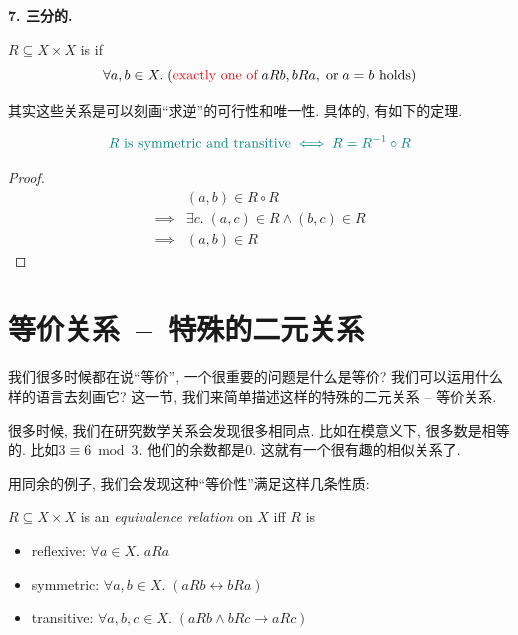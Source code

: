 \textbf{7. 三分的.}

\begin{definition}
  $R \subseteq X \times X$ is  if
  \[
    \forall a, b \in X.\;
      (\text{\textcolor{red}{exactly one of}}\; a R b, b R a, \;\text{or}\; a = b \text{ holds})
  \]
\end{definition}

其实这些关系是可以刻画``求逆''的可行性和唯一性. 具体的, 有如下的定理.

\begin{theorem}
  \[
    \textcolor{teal}{R \text{ is symmetric and transitive} \iff R = R^{-1} \circ R}
  \]
\end{theorem}

\begin{proof}
  \setcounter{equation}{0}
  \begin{align*}
    &(a, b) \in R \circ R \\[6pt]
    \implies& \exists c.\; (a, c) \in R \land (b, c) \in R \\
    \implies& (a, b) \in R
  \end{align*}
\end{proof}

\section{等价关系~--~特殊的二元关系}

我们很多时候都在说``等价'', 一个很重要的问题是什么是等价? 我们可以运用什么样的语言去刻画它? 这一节, 我们来简单描述这样的特殊的二元关系 -- 等价关系.

很多时候, 我们在研究数学关系会发现很多相同点. 比如在模意义下, 很多数是相等的. 比如$3 \equiv 6 \bmod 3$. 他们的余数都是$0$. 这就有一个很有趣的相似关系了. 

用同余的例子, 我们会发现这种``等价性''满足这样几条性质: 

\begin{definition}
  $R \subseteq X \times X$ is an {\it equivalence relation} on $X$ iff $R$ is
  \begin{itemize}
    \item reflexive: $\forall a \in X.\; a R a$
    \item symmetric: $\forall a, b \in X.\; (a R b \leftrightarrow b R a)$
    \item transitive: $\forall a, b, c \in X.\; (a R b \land b R c \to a R c)$
  \end{itemize}
\end{definition}

